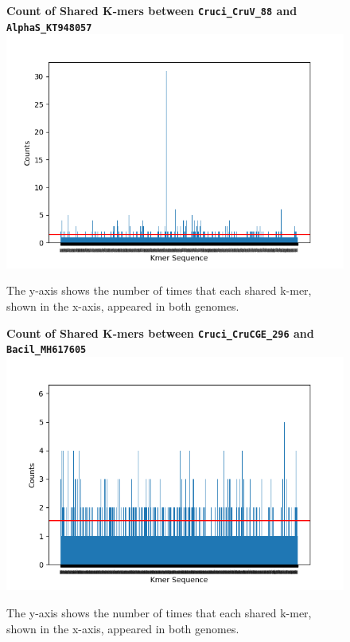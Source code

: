 \documentclass[eng]{ajceam-class}
\begin{document}
\begin{figure}
    \centering
    \textbf{Count of Shared K-mers between \texttt{Cruci\_CruV\_88} and \texttt{AlphaS\_KT948057}}
    \includegraphics[scale = 0.5]{ComparisonBetweenCruci88DNAKT04807.png}
    \caption{The y-axis shows the number of times that each shared k-mer, shown in the x-axis, appeared in both genomes.}
\end{figure}

\begin{figure}
    \centering
    \textbf{Count of Shared K-mers between \texttt{Cruci\_CruCGE\_296} and \texttt{Bacil\_MH617605}}
    \includegraphics[scale = 0.5]{ComparisonBetweenCruci296DNAMH617605.png}
    \caption{The y-axis shows  the number of times that each shared k-mer, shown in the x-axis, appeared in both genomes.}
\end{figure}
\end{document}

